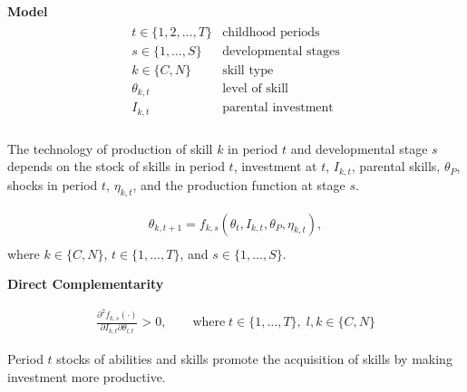 \begin{frame}
\textbf{Model}
\begin{align*}\begin{array}{ll}
t\in\{1, 2, \hdots, T\} & \text{childhood periods} \\
s\in\{1, \hdots, S\}    & \text{developmental stages}  \\
k \in\{C, N\}          & \text{skill type} \\
\theta_{k,t}           & \text{level of skill} \\
I_{k,t}                 & \text{parental investment} \\
\end{array}\end{align*}
\end{frame}
\begin{frame}
The technology of production of skill $k$ in period $t$ and developmental stage $s$ depends on the stock of skills in period $t$, investment at $t$, $I_{k,t}$, parental skills, $\theta_P$, shocks in period $t$, $\eta_{k, t}$, and the
production function at stage $s$.

\begin{align*}
\theta_{k, t + 1} = f_{k, s}(\theta_t, I_{k, t}, \theta_P, \eta_{k, t}), \\
\end{align*}
where $k\in\{C, N\}$, $t\in\{1, \hdots, T\}$, and $s\in\{1, \hdots, S\}$.

\end{frame}
\begin{frame}\textbf{Direct Complementarity}

\begin{align*}
\frac{\partial^2 f_{k, s}(\cdot)}{\partial I_{k, t}\partial \theta_{l, t}} > 0, \qquad\text{where}\;t\in\{1,\hdots,T\}, \; l,k\in\{C, N\}
\end{align*}

Period $t$ stocks of abilities and skills promote the acquisition of skills by making investment more productive.

\end{frame}
